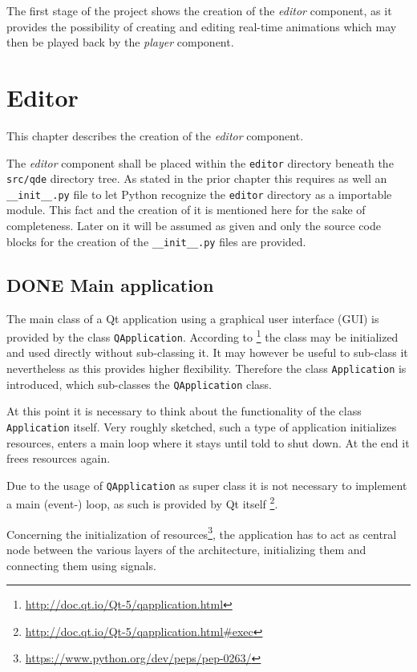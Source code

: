 \documentclass[10pt, openright, notitlepage]{scrreprt}
\begin{document}
The first stage of the project shows the creation of the \emph{editor} component, as
it provides the possibility of creating and editing real-time animations which
may then be played back by the \emph{player} component\cite[p. 29]{osterwalder_qde_2016}.
\section{Editor}
\label{sec:org98eaa9d}
This chapter describes the creation of the \emph{editor} component.

The \emph{editor} component shall be placed within the \texttt{editor} directory beneath the
\texttt{src/qde} directory tree. As stated in the prior chapter this requires as well
an \texttt{\_\_init\_\_.py} file to let Python recognize the \texttt{editor} directory as a
importable module. This fact and the creation of it is mentioned here for the
sake of completeness. Later on it will be assumed as given and only the source
code blocks for the creation of the \texttt{\_\_init\_\_.py} files are provided.
\subsection{{\bfseries\sffamily DONE} Main application}
\label{sec:orgf8f4e85}
The main class of a Qt application using a graphical user interface (GUI)
is provided by the class \texttt{QApplication}. According to
\footnote{\url{http://doc.qt.io/Qt-5/qapplication.html}} the class may be initialized and
used directly without sub-classing it. It may however be useful to sub-class it
nevertheless as this provides higher flexibility. Therefore the class
\texttt{Application} is introduced, which sub-classes the \texttt{QApplication} class.

At this point it is necessary to think about the functionality of the class
\texttt{Application} itself. Very roughly sketched, such a type of application
initializes resources, enters a main loop where it stays until told to shut
down. At the end it frees resources again.

Due to the usage of \texttt{QApplication} as super class it is not necessary to
implement a main (event-) loop, as such is provided by Qt itself
\footnote{\url{http://doc.qt.io/Qt-5/qapplication.html\#exec}}.

Concerning the initialization of
resources\footnote{\url{https://www.python.org/dev/peps/pep-0263/}}, the application has
to act as central node between the various layers of the architecture,
initializing them and connecting them using signals.\cite[S. 37 bis 38]{osterwalder_qde_2016}
\end{document}

